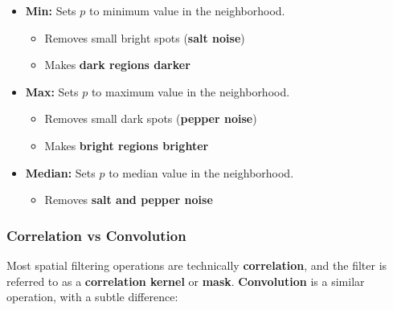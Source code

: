 \begin{itemize}
  \item \textbf{Min:} Sets $p$ to minimum value in the neighborhood.
    \begin{itemize}
      \item Removes small bright spots (\textbf{salt noise})
      \item Makes \textbf{dark regions darker}
    \end{itemize}
  \item \textbf{Max:} Sets $p$ to maximum value in the neighborhood.
    \begin{itemize}
      \item Removes small dark spots (\textbf{pepper noise})
      \item Makes \textbf{bright regions brighter}
    \end{itemize}
  \item \textbf{Median:} Sets $p$ to median value in the neighborhood.
    \begin{itemize}
      \item Removes \textbf{salt and pepper noise}
    \end{itemize}
\end{itemize}

\subsubsection*{Correlation vs Convolution}

Most spatial filtering operations are technically
\textbf{correlation}, and the filter is referred to as a
\textbf{correlation kernel} or \textbf{mask}. \textbf{Convolution} is
a similar operation, with a subtle difference:

